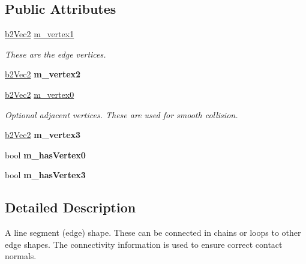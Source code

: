 \subsection*{Public Attributes}
\begin{DoxyCompactItemize}
\item 
\hypertarget{classb2_edge_shape_a916cf02a752ff1a70db35b2edaf19bb4}{\hyperlink{structb2_vec2}{b2\-Vec2} \hyperlink{classb2_edge_shape_a916cf02a752ff1a70db35b2edaf19bb4}{m\-\_\-vertex1}}\label{classb2_edge_shape_a916cf02a752ff1a70db35b2edaf19bb4}

\begin{DoxyCompactList}\small\item\em These are the edge vertices. \end{DoxyCompactList}\item 
\hypertarget{classb2_edge_shape_aa218bfe2bf135e4e94028b29aaa32fce}{\hyperlink{structb2_vec2}{b2\-Vec2} {\bfseries m\-\_\-vertex2}}\label{classb2_edge_shape_aa218bfe2bf135e4e94028b29aaa32fce}

\item 
\hypertarget{classb2_edge_shape_a907c9829484cc1ba7527ab368e9fdf93}{\hyperlink{structb2_vec2}{b2\-Vec2} \hyperlink{classb2_edge_shape_a907c9829484cc1ba7527ab368e9fdf93}{m\-\_\-vertex0}}\label{classb2_edge_shape_a907c9829484cc1ba7527ab368e9fdf93}

\begin{DoxyCompactList}\small\item\em Optional adjacent vertices. These are used for smooth collision. \end{DoxyCompactList}\item 
\hypertarget{classb2_edge_shape_a7991fd8b38806a7785748cd991c18452}{\hyperlink{structb2_vec2}{b2\-Vec2} {\bfseries m\-\_\-vertex3}}\label{classb2_edge_shape_a7991fd8b38806a7785748cd991c18452}

\item 
\hypertarget{classb2_edge_shape_a1d0f39259f0963146b343d6b048f3f8a}{bool {\bfseries m\-\_\-has\-Vertex0}}\label{classb2_edge_shape_a1d0f39259f0963146b343d6b048f3f8a}

\item 
\hypertarget{classb2_edge_shape_afeb0dfac66fe677ccd765d48610fa56f}{bool {\bfseries m\-\_\-has\-Vertex3}}\label{classb2_edge_shape_afeb0dfac66fe677ccd765d48610fa56f}

\end{DoxyCompactItemize}


\subsection{Detailed Description}
A line segment (edge) shape. These can be connected in chains or loops to other edge shapes. The connectivity information is used to ensure correct contact normals. 


